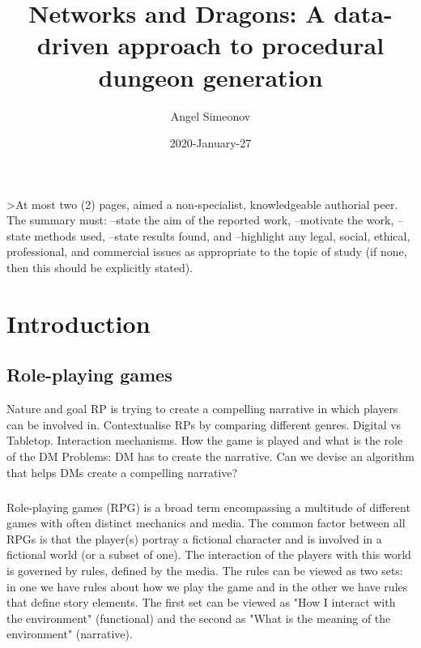 \documentclass{UoYCSproject}
\author{Angel Simeonov}
\title{Networks and Dragons: A data-driven approach to procedural dungeon generation}
\date{2020-January-27}
\begin{document}
\maketitle
\listoffigures
\listoftables

\begin{summary}
>At most two (2) pages, aimed a non-specialist, knowledgeable authorial peer.
The summary must:
--state the aim of the reported work,
--motivate the work,
--state methods used,
--state results found, and
--highlight any legal, social, ethical, professional, and commercial issues as appropriate to the topic of study (if none, then this should be explicitly stated).
\end{summary}

\chapter{Introduction}
\label{cha:Introduction}

\section{Role-playing games}
\begin{outline}
  \1 Nature and goal  RP is trying to create a compelling narrative in which players can be involved in.
    \2 Contextualise RPs by comparing different genres. Digital vs Tabletop.
  \1 Interaction mechanisms. How the game is played and what is the role of the DM
  \1 Problems: DM has to create the narrative. Can we devise an algorithm that helps DMs create a compelling narrative?
\end{outline}

\paragraph{}
Role-playing games (RPG) is a broad term encompassing a multitude of different games with often distinct mechanics and media. The common factor between all RPGs is that the player(s) portray a fictional character and is involved in a fictional world (or a subset of one). The interaction of the players with this world is governed by rules, defined by the media. The rules can be viewed as two sets: in one we have rules about how we play the game and in the other we have rules that define story elements. The first set can be viewed as "How I interact with the environment" (functional) and the second as "What is the meaning of the environment" (narrative). 
\end{document}
